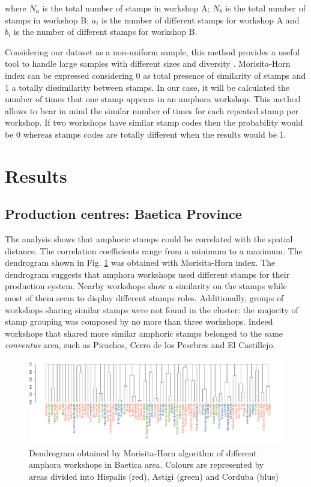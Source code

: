 \documentclass[review]{elsarticle}
\begin{document}
where $N_{a}$ is the total number of stamps in workshop A; $N_{b}$ is the total number of stamps in workshop B; $a_{i}$ is the number of different stamps for workshop A and $b_{i}$ is the number of different stamps for workshop B.

Considering our dataset as a non-uniform sample, this method provides a useful tool to handle large samples with different sizes and diversity \citep{wolda_similarity_1981}. Morisita-Horn index can be expressed considering 0 as total presence of similarity of stamps and 1 a totally dissimilarity between stamps. In our case, it will be calculated the number of times that one stamp appears in an amphora workshop. This method allows to bear in mind the similar number of times for each repeated stamp per workshop. If two workshops have similar stamp codes then the probability would be 0 whereas stamps codes are totally different when the results would be 1. 


\section{Results}

\subsection{Production centres: Baetica Province}

The analysis shows that amphoric stamps could be correlated with the spatial distance. The correlation coefficients range from a minimum to a maximum. The dendrogram shown in Fig. \ref{dendro} was obtained with Morisita-Horn index. The dendrogram suggests that amphora workshops used different stamps for their production system. Nearby workshops show a similarity on the stamps while most of them seem to display different stamps roles. Additionally, groups of workshops sharing similar stamps were not found in the cluster: the majority of stamp grouping was composed by no more than three workshops. Indeed workshops that shared more similar amphoric stamps belonged to the same \textit{conventus} area, such as Picachos, Cerro de los Pesebres and El Castillejo. 

\begin{figure}[htp]
	\centering
\includegraphics[width=\linewidth]{figs/dendro}
\caption{Dendrogram obtained by Morisita-Horn algorithm of different amphora workshops in Baetica area. Colours are represented by areas divided into Hispalis (red), Astigi (green) and Corduba (blue)}
\label{dendro}
\end{figure} 
\end{document}
